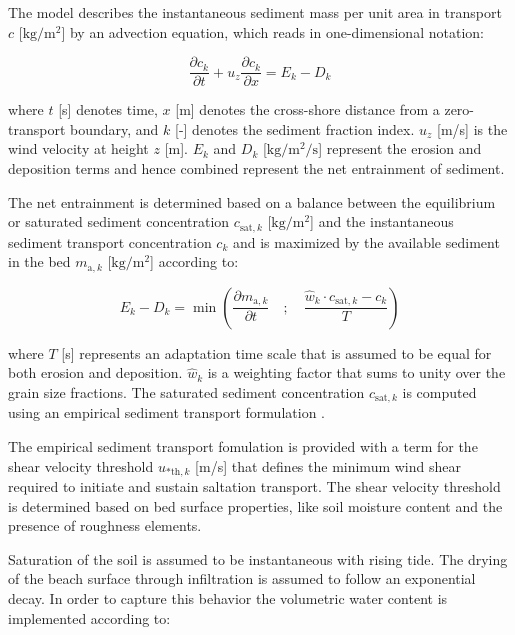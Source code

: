 \documentclass[preprint,12pt,authoryear]{elsarticle}
\begin{document}
The model describes the instantaneous sediment mass per unit area in
transport $c$ [$\mathrm{kg/m^2}$] by an advection equation, which
reads in one-dimensional notation:

\begin{equation}
  \label{eq:advection}
  \frac{\partial c_k}{\partial t} + u_z \frac{\partial c_k}{\partial x} = E_k - D_k
\end{equation}

\noindent where $t$ [s] denotes time, $x$ [m] denotes the cross-shore
distance from a zero-transport boundary, and $k$ [-] denotes the
sediment fraction index. $u_z$ [m/s] is the wind velocity at height
$z$ [m]. $E_k$ and $D_k$ [$\mathrm{kg/m^2/s}$] represent the erosion
and deposition terms and hence combined represent the net entrainment
of sediment.

The net entrainment is determined based on a balance between the
equilibrium or saturated sediment concentration $c_{\mathrm{sat},k}$
[$\mathrm{kg/m^2}$] and the instantaneous sediment transport
concentration $c_k$ and is maximized by the available sediment in the
bed $m_{\mathrm{a},k}$ [$\mathrm{kg/m^2}$] according to:

\begin{equation}
  \label{eq:erodep}
  E_k - D_k = \min \left ( \frac{\partial m_{\mathrm{a},k}}{\partial t} \quad ; \quad \frac{\hat{w}_k \cdot c_{\mathrm{sat},k} - c_k}{T} \right )
\end{equation}

\noindent where $T$ [s] represents an adaptation time scale that is
assumed to be equal for both erosion and deposition. $\hat{w}_k$ is a
weighting factor that sums to unity over the grain size fractions. The
saturated sediment concentration $c_{\mathrm{sat},k}$ is computed
using an empirical sediment transport formulation
\citep[e.g.][]{Bagnold1937a}.

The empirical sediment transport fomulation is provided with a term
for the shear velocity threshold $u_{\mathrm{* th},k}$ [m/s] that
defines the minimum wind shear required to initiate and sustain
saltation transport. The shear velocity threshold is determined based
on bed surface properties, like soil moisture content and the presence
of roughness elements.

Saturation of the soil is assumed to be instantaneous with rising
tide. The drying of the beach surface through infiltration is assumed
to follow an exponential decay. In order to capture this behavior the
volumetric water content is implemented according to:
\end{document}
